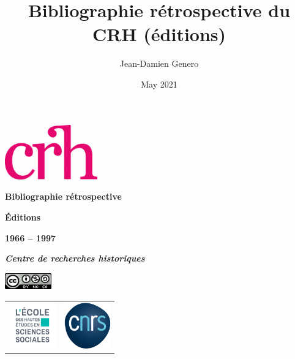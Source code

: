 \documentclass{article}
\title{Bibliographie rétrospective du CRH (éditions)}
\author{Jean-Damien Genero}
\date{May 2021}
\newcommand\blankpage{%
    \null
    \thispagestyle{empty}%
    \addtocounter{page}{-1}%
    \newpage}
\begin{document}
	
\renewcommand{\contentsname}{Sommaire}


\begin{titlepage}
	\begin{center}
		
		\vspace*{1,50cm}
		
		\includegraphics[width=4cm]{../../../img/logo_crh_magenta.png}
		\bigskip
		\bigskip
		\bigskip
		\bigskip
		
		\begin{Huge}
			\textbf{Bibliographie rétrospective}
			
			\bigskip
			
			\bigskip
			
			\textbf{Éditions}
		\end{Huge}
		
		\begin{LARGE}
			\bigskip
			
			\bigskip
			
			\textbf{1966 -- 1997}
			
			\bigskip
			
			\textbf{\emph{Centre de recherches historiques} }\\
		\end{LARGE}
		
		\bigskip
		
		\vspace*{2.25cm}
		
		\includegraphics[width=2cm]{../../../img/licenseccby-nc-sa4.0.png}
		
		\vspace*{3,5cm}
		
		\begin{tabular}{cc}
			\includegraphics[width=2cm]{../../../img/Logo_EHESS_2021_RVB.png} & \includegraphics[width=2cm]{../../../img/cnrslogo.png} \\
		\end{tabular}
		
	\end{center}
	\afterpage{\blankpage}
\end{titlepage}
\end{document}
